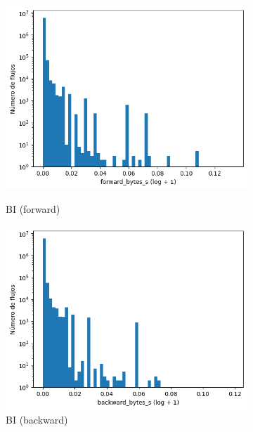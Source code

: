 \begin{figure}[H]
\begin{subfigure}[b]{0.26\textwidth}
        \includegraphics[width=\textwidth]{media/packet_pincer_botiot/forward_bytes_s_log_x_log_y.png}
        \caption{BI (forward)}
        \includegraphics[width=\textwidth]{media/packet_pincer_botiot/backward_bytes_s_log_x_log_y.png}
        \caption{BI (backward)}
    \end{subfigure}
    \hfill
    \begin{subfigure}[b]{0.26\textwidth}
        \centering

\end{subfigure}
\end{figure}
